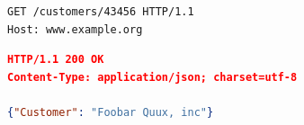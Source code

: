 \begin{samepage}
\begin{lstlisting}[label=lst:background:apis:rest-request,caption={[An example RESTful request]An equivalent \glsac{http} consumer request to that of \cref{lst:background:apis:soap-request}, but using \gls{rest}. Source: \citep{Ballinger:2014aa}.}]
GET /customers/43456 HTTP/1.1
Host: www.example.org
\end{lstlisting}
\begin{lstlisting}[language=json,label=lst:background:apis:rest-response,caption={[An example RESTful response]The \gls{rest} \glsac{http} service provider response for \cref{lst:background:apis:rest-request}.}]
HTTP/1.1 200 OK
Content-Type: application/json; charset=utf-8

{"Customer": "Foobar Quux, inc"}
\end{lstlisting}
\end{samepage}

